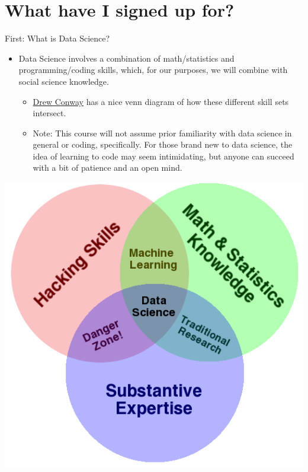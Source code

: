 \documentclass[
  letterpaper,
  DIV=11,
  numbers=noendperiod]{scrreprt}
\providecommand{\tightlist}{%
  \setlength{\itemsep}{0pt}\setlength{\parskip}{0pt}}\usepackage{longtable,booktabs,array}
\begin{document}
\hypertarget{what-have-i-signed-up-for}{%
\section{What have I signed up for?}\label{what-have-i-signed-up-for}}

First: What is Data Science?

\begin{itemize}
\tightlist
\item
  Data Science involves a combination of math/statistics and
  programming/coding skills, which, for our purposes, we will combine
  with social science knowledge.

  \begin{itemize}
  \tightlist
  \item
    \href{http://drewconway.com/zia/2013/3/26/the-data-science-venn-diagram}{Drew
    Conway} has a nice venn diagram of how these different skill sets
    intersect.
  \item
    Note: This course will not assume prior familiarity with data
    science in general or coding, specifically. For those brand new to
    data science, the idea of learning to code may seem intimidating,
    but anyone can succeed with a bit of patience and an open mind.
  \end{itemize}
\end{itemize}

\includegraphics{images/venn.png}
\end{document}
